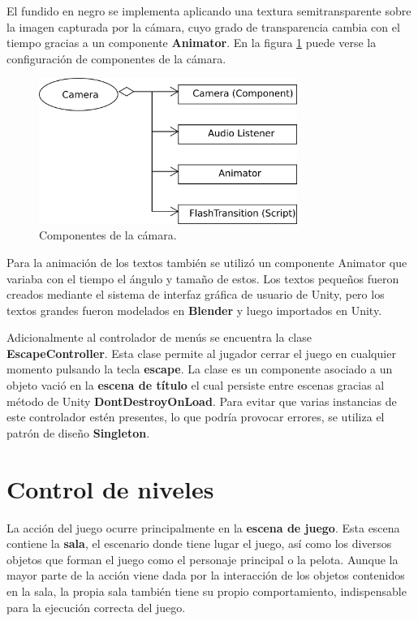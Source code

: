 El fundido en negro se implementa aplicando una textura semitransparente sobre la imagen capturada por la cámara, cuyo grado de transparencia cambia con el tiempo gracias a un componente \textbf{Animator}. En la figura \ref{camara_components} puede verse la configuración de componentes de la cámara.
\begin{figure}[h]
    \centering
    \includegraphics[width=0.75\textwidth]{images/estructura/menu/camera}
    \caption{Componentes de la cámara.}
    \label{camara_components}
\end{figure}

Para la animación de los textos también se utilizó un componente Animator que variaba con el tiempo el ángulo y tamaño de estos. Los textos pequeños fueron creados mediante el sistema de interfaz gráfica de usuario de Unity, pero los textos grandes fueron modelados en \textbf{Blender} y luego importados en Unity.

Adicionalmente al controlador de menús se encuentra la clase \textbf{EscapeController}. Esta clase permite al jugador cerrar el juego en cualquier momento pulsando la tecla \textbf{escape}. La clase es un componente asociado a un objeto vació en la \textbf{escena de título} el cual persiste entre escenas gracias al método de Unity \textbf{DontDestroyOnLoad}. Para evitar que varias instancias de este controlador estén presentes, lo que podría provocar errores, se utiliza el patrón de diseño \textbf{Singleton}.

\section{Control de niveles}
La acción del juego ocurre principalmente en la \textbf{escena de juego}. Esta escena contiene la \textbf{sala}, el escenario donde tiene lugar el juego, así como los diversos objetos que forman el juego como el personaje principal o la pelota. Aunque la mayor parte de la acción viene dada por la interacción de los objetos contenidos en la sala, la propia sala también tiene su propio comportamiento, indispensable para la ejecución correcta del juego.


